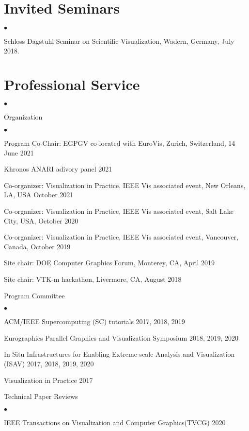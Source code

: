 \documentclass[margin,line]{res}
\newenvironment{list2}{
  \begin{list}{$\bullet$}{%
      \setlength{\itemsep}{0in}
      \setlength{\parsep}{0in} \setlength{\parskip}{0in}
      \setlength{\topsep}{0in} \setlength{\partopsep}{0in}
      \setlength{\leftmargin}{0.2in}}}{\end{list}}
\begin{document}
\begin{resume}
\section{\sc Invited Seminars}
\begin{list2}
	\item Schloss Dagstuhl Seminar on Scientific Visualization,  Wadern,
	Germany, July 2018.
\end{list2}

\section{\sc Professional Service}
\begin{list2}
	\item Organization
		\begin{list2}
			\item Program Co-Chair: EGPGV co-located with EuroVis, Zurich, Switzerland, 14 June 2021
      \item Khronos ANARI adivory panel 2021
			\item Co-organizer: Visualization in Practice, IEEE Vis associated event, New Orleans, LA, USA
 October 2021
			\item Co-organizer: Visualization in Practice, IEEE Vis associated event, Salt Lake City, USA, October 2020
			\item Co-organizer: Visualization in Practice, IEEE Vis associated event, Vancouver, Canada, October 2019
			\item Site chair: DOE Computer Graphics Forum, Monterey, CA, April 2019
			\item Site chair: VTK-m hackathon, Livermore, CA, August 2018
		\end{list2}
	\item Program Committee
		\begin{list2}
			\item ACM/IEEE Supercomputing (SC) tutorials 2017, 2018, 2019
			\item Eurographics Parallel Graphics and Visualization Symposium 2018, 2019, 2020
			\item In Situ Infrastructures for Enabling Extreme-scale Analysis and Visualization (ISAV) 2017, 2018, 2019, 2020
		    \item Visualization in Practice 2017
		\end{list2}
	\item Technical Paper Reviews
	\begin{list2}
		\item IEEE Transactions on Visualization and Computer Graphics(TVCG) 2020

\end{list2}
\end{list2}
\end{resume}
\end{document}
